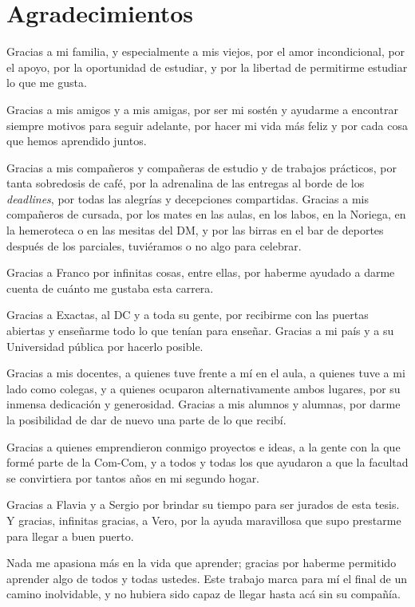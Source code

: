\chapter*{Agradecimientos}

Gracias a mi familia, y especialmente a mis viejos, por el amor incondicional,
por el apoyo, por la oportunidad de estudiar, y por la libertad de permitirme
estudiar lo que me gusta.

Gracias a mis amigos y a mis amigas, por ser mi sostén y ayudarme a encontrar
siempre motivos para seguir adelante,
por hacer mi vida más feliz y por cada cosa que hemos aprendido juntos.

Gracias a mis compañeros y compañeras de estudio y de trabajos prácticos, por
tanta sobredosis de café, por la adrenalina de las entregas al borde de los
\emph{deadlines}, por todas las alegrías y decepciones compartidas.
Gracias a mis compañeros de cursada, por los mates en las aulas, en los labos,
en la Noriega, en la hemeroteca o en las mesitas del DM, y por las birras en el
bar de deportes después de los parciales, tuviéramos o no algo para celebrar.

Gracias a Franco por infinitas cosas, entre ellas, por haberme ayudado a darme
cuenta de cuánto me gustaba esta carrera.

Gracias a Exactas, al DC y a toda su gente, por recibirme con las puertas
abiertas y enseñarme todo lo que tenían para enseñar. Gracias a mi país y a su
Universidad pública por hacerlo posible.

Gracias a mis docentes, a quienes tuve frente a mí en el aula, a quienes tuve a
mi lado como colegas, y a quienes ocuparon alternativamente ambos lugares,
por su inmensa dedicación y
generosidad.
Gracias a mis alumnos y alumnas, por darme la posibilidad de dar de nuevo una
parte de lo que recibí.

Gracias a quienes emprendieron conmigo proyectos e ideas, a la gente con la que
formé parte de la Com-Com, y a todos y todas los que ayudaron a que la facultad
se convirtiera por tantos años en mi segundo hogar.

Gracias a Flavia y a Sergio por brindar su tiempo para ser jurados de esta
tesis.
Y gracias, infinitas gracias, a Vero, por la ayuda maravillosa que supo
prestarme para llegar a buen puerto.

\medskip

Nada me apasiona más en la vida que aprender;
gracias por haberme permitido aprender algo de todos y todas ustedes.
Este trabajo marca para mí el final de un camino inolvidable, y no hubiera sido
capaz de llegar hasta acá sin su compañía.

